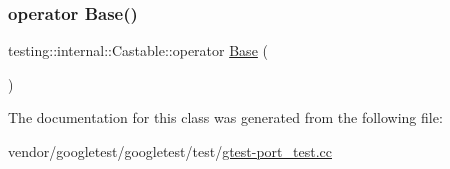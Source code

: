 \subsubsection{\texorpdfstring{operator Base()}{operator Base()}}
{\footnotesize\ttfamily testing\+::internal\+::\+Castable\+::operator \hyperlink{class_base}{Base} (\begin{DoxyParamCaption}{ }\end{DoxyParamCaption})\hspace{0.3cm}{\ttfamily [inline]}}



The documentation for this class was generated from the following file\+:\begin{DoxyCompactItemize}
\item 
vendor/googletest/googletest/test/\hyperlink{gtest-port__test_8cc}{gtest-\/port\+\_\+test.\+cc}\end{DoxyCompactItemize}
